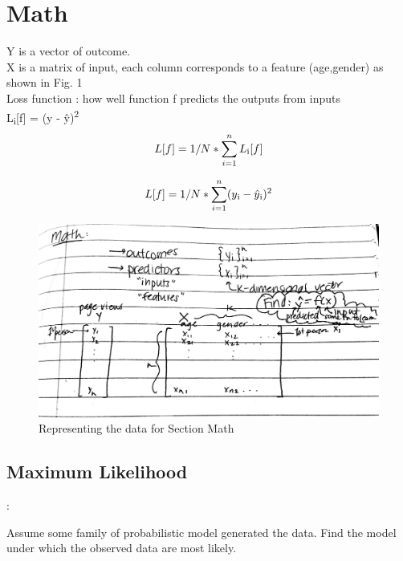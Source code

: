 \section{Math}

Y is a vector of outcome. \\
X is a matrix of input, each column corresponds to a feature (age,gender) as shown in Fig. 1 \\ 
Loss function : how well function f predicts the outputs from inputs \\
L\textsubscript{i}[f] = (y - \^{y})\textsuperscript{2}
\begin{equation}
	L[f] = 1/ N *  \sum\limits_{i=1}^n L\textsubscript{i}[f]
\end{equation}

\begin{equation}
	L[f] = 1/ N *  \sum\limits_{i=1}^n (y\textsubscript{i} - \hat{y}\textsubscript{i})^2
\end{equation}



\begin{figure}[ht]
  \begin{center}
    \includegraphics[width=\textwidth]{figures/fig1.jpg}
    \caption{ Representing the data for Section Math}
   \end{center}
\end{figure}

\subsection{Maximum Likelihood}:

Assume some family of probabilistic model generated the data. Find the model under which the observed data are most likely.\\


